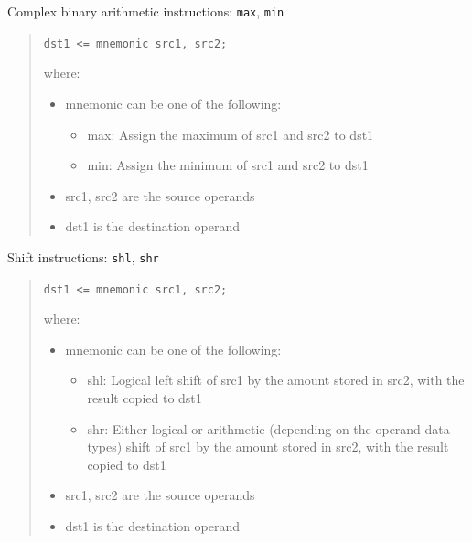 \documentclass[a4paper]{article}
\begin{document}
Complex binary arithmetic instructions: \texttt{max}, \texttt{min}
%
\begin{quote}

\texttt{dst1 <= mnemonic src1, src2;}

where:
%
\begin{itemize}

\item mnemonic can be one of the following:
%
\begin{itemize}

\item max: Assign the maximum of src1 and src2 to dst1

\item min: Assign the minimum of src1 and src2 to dst1

\end{itemize}

\item src1, src2 are the source operands

\item dst1 is the destination operand

\end{itemize}

\end{quote}

Shift instructions: \texttt{shl}, \texttt{shr}
%
\begin{quote}

\texttt{dst1 <= mnemonic src1, src2;}

where:
%
\begin{itemize}

\item mnemonic can be one of the following:
%
\begin{itemize}

\item shl: Logical left shift of src1 by the amount stored in src2, with
the result copied to dst1

\item shr: Either logical or arithmetic (depending on the operand data types)
shift of src1 by the amount stored in src2, with the result copied to
dst1

\end{itemize}

\item src1, src2 are the source operands

\item dst1 is the destination operand

\end{itemize}

\end{quote}
\end{document}
